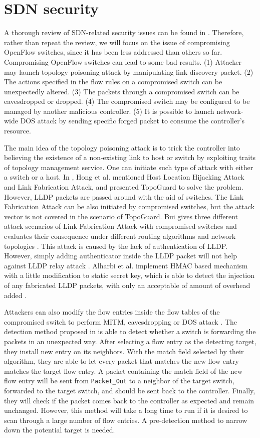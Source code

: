 \section{SDN security}
\label{SDN security}
A thorough review of SDN-related security issues can be found in \cite{LAB14, CM, SOS13, KJK}. Therefore, rather than repeat the review, we will focus on the issue of compromising OpenFlow switches, since it has been less addressed than others so far. Compromising OpenFlow switches can lead to some bad results. (1) Attacker may launch topology poisoning attack by manipulating link discovery packet. (2) The actions specified in the flow rules on a compromised switch can be unexpectedly altered. (3) The packets through a compromised switch can be eavesdropped or dropped. (4) The compromised switch may be configured to be managed by another malicious controller. (5) It is possible to launch network-wide DOS attack by sending specific forged packet to consume the controller's resource.

The main idea of the topology poisoning attack is to trick the controller into believing the existence of a non-existing link to host or switch by exploiting traits of topology management service. One can initiate such type of attack with either a switch or a host. In \cite{HXWG15}, Hong et al. mentioned Host Location Hijacking Attack and Link Fabrication Attack, and presented TopoGuard to solve the problem. However, LLDP packets are passed around with the aid of switches. The Link Fabrication Attack can be also initiated by compromised switches, but the attack vector  is not covered in the scenario of TopoGuard. Bui gives three different attack scenarios of Link Fabrication Attack with compromised switches and evaluates their consequence under different routing algorithms and network topologies \cite{TTB15}. This attack is caused by the lack of authentication of LLDP. However, simply adding authenticator inside the LLDP packet will not help against LLDP relay attack \cite{HXWG15}. Alharbi et al. implement HMAC based mechanism with a little modification to static secret key, which is able to detect the injection of any fabricated LLDP packets, with only an acceptable of amount of overhead added \cite{ATPP15}.

Attackers can also modify the flow entries inside the flow tables of the compromised switch to perform MITM, eavesdropping or DOS attack \cite{AAS14}. The detection method proposed in \cite{CKGL15} is able to detect whether a switch is forwarding the packets in an unexpected way. After selecting a flow entry as the detecting target, they install new entry on its neighbors. With the match field selected by their algorithm, they are able to let every packet that matches the new flow entry matches the target flow entry. A packet containing the match field of the new flow entry will be sent from \texttt{Packet\_Out} to a neighbor of the target switch, forwarded to the target switch, and should be sent back to the controller. Finally, they will check if the packet comes back to the controller as expected and remain unchanged. However, this method will take a long time to run if it is desired to scan through a large number of flow entries. A pre-detection method to narrow down the potential target is needed.